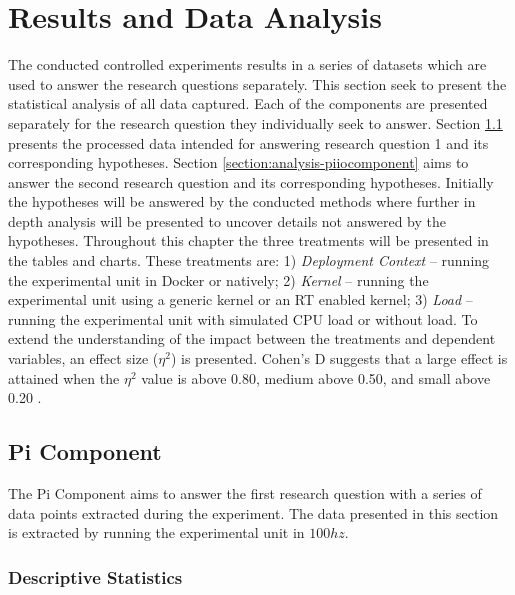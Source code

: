\iffalse  \fi
\chapter{Results and Data Analysis}\label{section:data-analysis}

The conducted controlled experiments results in a series of datasets which are used to answer the research questions separately. This section seek to present the statistical analysis of all data captured. Each of the components are presented separately for the research question they individually seek to answer. Section \ref{section:analysis-picomponent} presents the processed data intended for answering research question 1 and its corresponding hypotheses. Section \ref{section:analysis-piiocomponent} aims to answer the second research question and its corresponding hypotheses. Initially the hypotheses will be answered by the conducted methods where further in depth analysis will be presented to uncover details not answered by the hypotheses. Throughout this chapter the three treatments will be presented in the tables and charts. These treatments are: 1) \textit{Deployment Context} – running the experimental unit in Docker or natively; 2) \textit{Kernel} – running the experimental unit using a generic kernel or an RT enabled kernel; 3) \textit{Load} – running the experimental unit with simulated CPU load or without load. To extend the understanding of the impact between the treatments and dependent variables, an effect size ($\eta^{2}$) is presented. Cohen's D suggests that a large effect is attained when the $\eta^{2}$ value is above 0.80, medium above 0.50, and small above 0.20 \cite{jackson2013statistics}.

\section{Pi Component}
\label{section:analysis-picomponent}

The Pi Component aims to answer the first research question with a series of data points extracted during the experiment. The data presented in this section is extracted by running the experimental unit in $100hz$.


\subsection{Descriptive Statistics}
\label{section:analysis-picomponent-desc}

